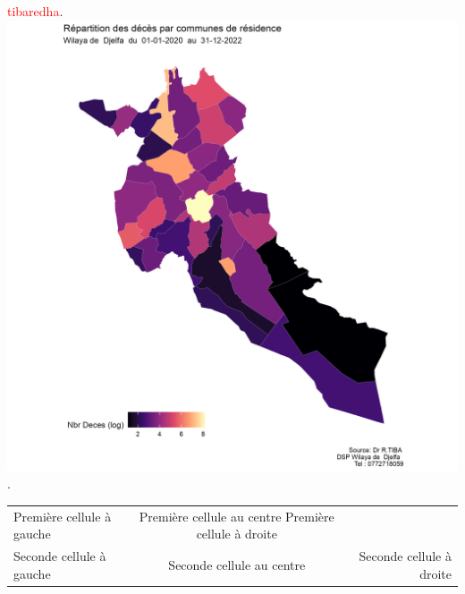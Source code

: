 \documentclass[]{article}
\begin{document}
\textcolor{red}{tibaredha}.
\includegraphics[]{img/SIG_commune_Djelfa}.

\begin{tabular}{|l|c|r|}
Première cellule à gauche
 & Première cellule au centre
 Première cellule à droite \\
 Seconde cellule à gauche
 & Seconde cellule au centre
 & Seconde cellule à droite \\
 \end{tabular}





%



%
%
%
%
%
%
%




\end{document}

